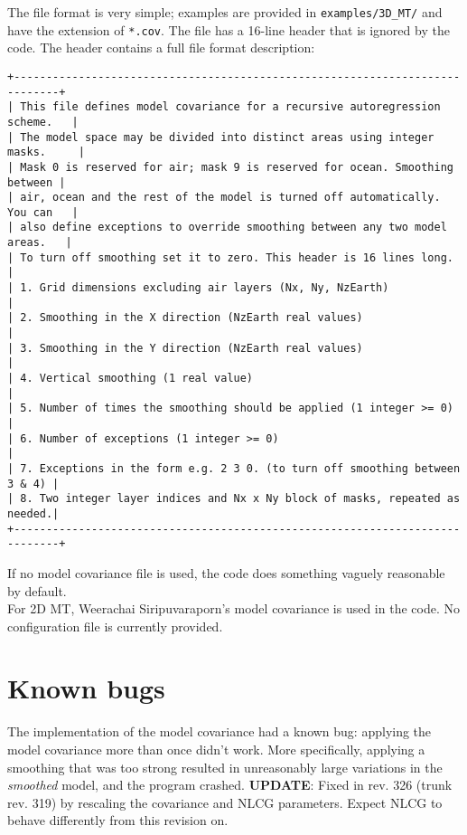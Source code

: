 \documentclass[12pt]{article}
\begin{document}
The file format is very simple; examples are provided in \verb"examples/3D_MT/" and have the extension of \verb"*.cov". The file has a 16-line header that is ignored by the code. The header contains a full file format description:
\begin{verbatim}
+-----------------------------------------------------------------------------+
| This file defines model covariance for a recursive autoregression scheme.   |
| The model space may be divided into distinct areas using integer masks.     |
| Mask 0 is reserved for air; mask 9 is reserved for ocean. Smoothing between |
| air, ocean and the rest of the model is turned off automatically. You can   |
| also define exceptions to override smoothing between any two model areas.   |
| To turn off smoothing set it to zero. This header is 16 lines long.         |
| 1. Grid dimensions excluding air layers (Nx, Ny, NzEarth)                   |
| 2. Smoothing in the X direction (NzEarth real values)                       |
| 3. Smoothing in the Y direction (NzEarth real values)                       |
| 4. Vertical smoothing (1 real value)                                        |
| 5. Number of times the smoothing should be applied (1 integer >= 0)         |
| 6. Number of exceptions (1 integer >= 0)                                    |
| 7. Exceptions in the form e.g. 2 3 0. (to turn off smoothing between 3 & 4) |
| 8. Two integer layer indices and Nx x Ny block of masks, repeated as needed.|
+-----------------------------------------------------------------------------+
\end{verbatim}

If no model covariance file is used, the code does something vaguely reasonable by default.\\

For 2D MT, Weerachai Siripuvaraporn's model covariance is used in the code. No configuration file is currently provided.\\


\section{Known bugs}

The implementation of the model covariance had a known bug: applying the model covariance more than once didn't work. More specifically, applying a smoothing that was too strong resulted in unreasonably large variations in the \emph{smoothed} model, and the program crashed. \textbf{UPDATE}: Fixed in rev. 326 (trunk rev. 319) by rescaling the covariance and NLCG parameters. Expect NLCG to behave differently from this revision on.\\
\end{document}
